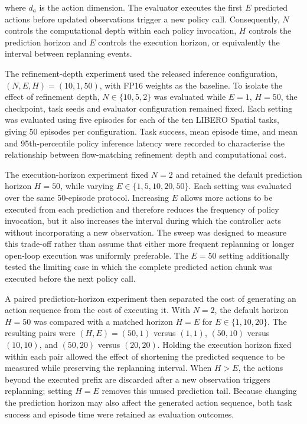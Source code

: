 where \(d_a\) is the action dimension. The evaluator executes the first \(E\) predicted actions before updated observations trigger a new policy call. Consequently, \(N\) controls the computational depth within each policy invocation, \(H\) controls the prediction horizon and \(E\) controls the execution horizon, or equivalently the interval between replanning events.

The refinement-depth experiment used the released inference configuration, \((N,E,H)=(10,1,50)\), with FP16 weights as the baseline. To isolate the effect of refinement depth, \(N\in\{10,5,2\}\) was evaluated while \(E=1\), \(H=50\), the checkpoint, task seeds and evaluator configuration remained fixed. Each setting was evaluated using five episodes for each of the ten LIBERO Spatial tasks, giving 50 episodes per configuration. Task success, mean episode time, and mean and 95th-percentile policy inference latency were recorded to characterise the relationship between flow-matching refinement depth and computational cost.

The execution-horizon experiment fixed \(N=2\) and retained the default prediction horizon \(H=50\), while varying \(E\in\{1,5,10,20,50\}\). Each setting was evaluated over the same 50-episode protocol. Increasing \(E\) allows more actions to be executed from each prediction and therefore reduces the frequency of policy invocation, but it also increases the interval during which the controller acts without incorporating a new observation. The sweep was designed to measure this trade-off rather than assume that either more frequent replanning or longer open-loop execution was uniformly preferable. The \(E=50\) setting additionally tested the limiting case in which the complete predicted action chunk was executed before the next policy call.

A paired prediction-horizon experiment then separated the cost of generating an action sequence from the cost of executing it. With \(N=2\), the default horizon \(H=50\) was compared with a matched horizon \(H=E\) for \(E\in\{1,10,20\}\). The resulting pairs were \((H,E)=(50,1)\) versus \((1,1)\), \((50,10)\) versus \((10,10)\), and \((50,20)\) versus \((20,20)\). Holding the execution horizon fixed within each pair allowed the effect of shortening the predicted sequence to be measured while preserving the replanning interval. When \(H>E\), the actions beyond the executed prefix are discarded after a new observation triggers replanning; setting \(H=E\) removes this unused prediction tail. Because changing the prediction horizon may also affect the generated action sequence, both task success and episode time were retained as evaluation outcomes.

